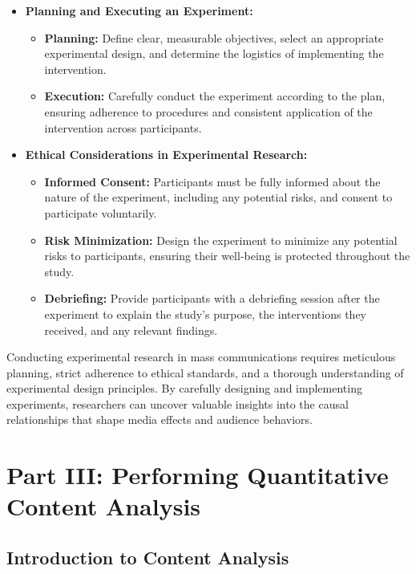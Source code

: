\documentclass[
]{book}
\providecommand{\tightlist}{%
  \setlength{\itemsep}{0pt}\setlength{\parskip}{0pt}}
\begin{document}
\begin{itemize}
\tightlist
\item
  \textbf{Planning and Executing an Experiment:}

  \begin{itemize}
  \tightlist
  \item
    \textbf{Planning:} Define clear, measurable objectives, select an appropriate experimental design, and determine the logistics of implementing the intervention.
  \item
    \textbf{Execution:} Carefully conduct the experiment according to the plan, ensuring adherence to procedures and consistent application of the intervention across participants.
  \end{itemize}
\item
  \textbf{Ethical Considerations in Experimental Research:}

  \begin{itemize}
  \tightlist
  \item
    \textbf{Informed Consent:} Participants must be fully informed about the nature of the experiment, including any potential risks, and consent to participate voluntarily.
  \item
    \textbf{Risk Minimization:} Design the experiment to minimize any potential risks to participants, ensuring their well-being is protected throughout the study.
  \item
    \textbf{Debriefing:} Provide participants with a debriefing session after the experiment to explain the study's purpose, the interventions they received, and any relevant findings.
  \end{itemize}
\end{itemize}

Conducting experimental research in mass communications requires meticulous planning, strict adherence to ethical standards, and a thorough understanding of experimental design principles. By carefully designing and implementing experiments, researchers can uncover valuable insights into the causal relationships that shape media effects and audience behaviors.

\hypertarget{part-iii-performing-quantitative-content-analysis}{%
\section{Part III: Performing Quantitative Content Analysis}\label{part-iii-performing-quantitative-content-analysis}}

\hypertarget{introduction-to-content-analysis}{%
\subsection*{Introduction to Content Analysis}\label{introduction-to-content-analysis}}
\end{document}
